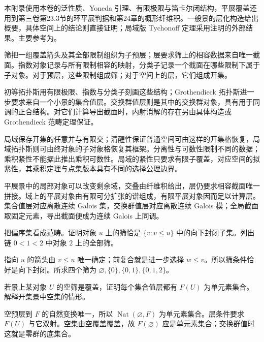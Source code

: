 \ProseParagraphBreak
本附录使用本卷的泛性质、Yoneda 引理、有限极限与笛卡尔闭结构，平展覆盖还用到第三卷第23.3节的环平展判据和第24章的概形纤维积。一般景的层化构造给出概要，具体空间上的结论则直接证明；局域版 Tychonoff 定理采用注明的外部结果。主要参考为\cite[Chapters I--IV; Chapter IX, Sections 2--3]{MacLaneMoerdijk1992Sheaves}。






\begin{chaptersummary}
	筛把一组覆盖箭头及其全部限制组织为子预层；层要求筛上的相容数据来自唯一截面。指数对象记录与所有限制相容的映射，分类子记录一个截面在哪些限制下属于子对象。对于预层，这些限制组成筛；对于空间上的层，它们组成开集。

	\ProseParagraphBreak
	初等拓扑斯用有限极限、指数与分类子刻画这些结构；Grothendieck 拓扑斯进一步要求来自一个小景的集合值层。交换群值层则是其中的交换群对象，具有用于同调的正合结构。对它们计算导出截面时，内射消解的存在另由具体构造或 Grothendieck 范畴定理保证。

	\ProseParagraphBreak
	局域保存开集的任意并与有限交；清醒性保证普通空间可由这样的开集格恢复，局域拓扑斯则可由终对象的子对象格恢复其框架。分离性与可数性限制不同的数据；乘积紧性不能据此推出乘积可数性。局域的紧性只要求有限子覆盖，对应空间的拟紧性，其乘积定理与点集版本具有不同的选择公理边界。

	\ProseParagraphBreak
	平展景中的局部对象可以改变剩余域，交叠由纤维积给出，层仍要求相容截面唯一拼接。域上的平展对象由有限可分扩张的谱组成，有限平展对象因而足以计算层。集合值层对应离散连续 Galois 集，交换群值层对应离散连续 Galois 模；全局截面取固定元素，导出截面便成为连续 Galois 上同调。
\end{chaptersummary}

\BookExercises

\begin{exercise}\label{b4:ex:E-sieve-downset}
	把偏序集看成范畴。证明对象 \(u\) 上的筛恰是 \(\{v:v\le u\}\) 中的向下封闭子集。列出链 \(0<1<2\) 中对象 \(2\) 上的全部筛。
\end{exercise}
\begin{solution}
	指向 \(u\) 的箭头由 \(v\le u\) 唯一确定；前复合就是进一步选择 \(w\le v\)。所以筛条件恰好是向下封闭。所求四个筛为 \(\varnothing,\{0\},\{0,1\},\{0,1,2\}\)。
\end{solution}

\begin{exercise}\label{b4:ex:E-empty-cover}
	若景上某对象 \(U\) 的空筛是覆盖，证明每个集合值层都有 \(F(U)\) 为单元素集合。解释开集景中空集的情形。
\end{exercise}
\begin{solution}
	空预层到 \(F\) 的自然变换唯一，所以 \(\operatorname{Nat}(\varnothing,F)\) 为单元素集合。层条件要求 \(F(U)\) 与它双射。空集由空覆盖覆盖，故 \(F(\varnothing)\) 应是单元素集合；交换群值时这就是零群的底集合。
\end{solution}


